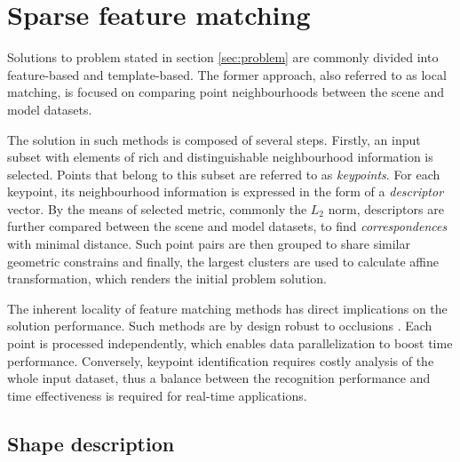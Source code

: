 
\chapter{Sparse feature matching}
\label{cha:feature}


Solutions to problem stated in section \ref{sec:problem} are commonly divided \cite{something} into feature-based and template-based. The former approach, also referred to as local matching, is focused on comparing point neighbourhoods between the scene and model datasets. 

The solution in such methods is composed of several steps. Firstly, an input subset with elements of rich and distinguishable neighbourhood information is selected. Points that belong to this subset are referred to as \textit{keypoints}. For each keypoint, its neighbourhood information is expressed in the form of a \textit{descriptor} vector. By the means of selected metric, commonly the $L_2$ norm, descriptors are further compared between the scene and model datasets, to find \textit{correspondences} with minimal distance. Such point pairs are then grouped to share similar geometric constrains and finally, the largest clusters are used to calculate affine transformation, which renders the initial problem solution.

The inherent locality of feature matching methods has direct implications on the solution performance. Such methods are by design robust to occlusions \cite{something}. Each point is processed independently, which enables data parallelization to boost time performance. Conversely, keypoint identification requires costly analysis of the whole input dataset, thus a balance between the recognition performance and time effectiveness is required \cite{somethin} for real-time applications.


\section{Shape description} %
\label{sec:shape} %

